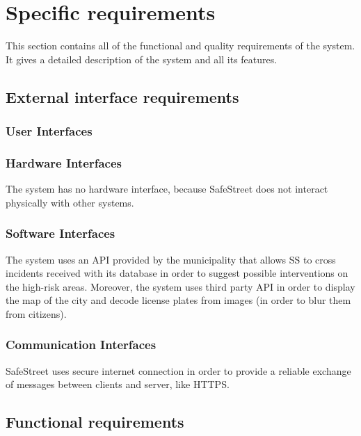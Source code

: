 \documentclass[../RASD.tex]{subfiles}
\begin{document}
    \chapter{Specific requirements}\label{ch:specific-requirements}
    This section contains all of the functional and quality requirements of the system. It gives a detailed description of the system and all its features.
        \section{External interface requirements}\label{sec:external-interface-requirements}
            \subsection{User Interfaces}\label{subsec:user-interfaces}
            \subsection{Hardware Interfaces}\label{subsec:hardware-interfaces}
    The system has no hardware interface, because SafeStreet does not interact physically with other systems.
    \subsection{Software Interfaces}\label{subsec:software-interfaces}
    The system uses an API provided by the municipality that allows SS to cross incidents received with its database in order to suggest possible interventions on the high-risk areas. Moreover, the system uses third party API in order to display the map of the city and decode license plates from images (in order to blur them from citizens).
    \subsection{Communication Interfaces}\label{subsec:communication-interface}
    SafeStreet uses secure internet connection in order to provide a reliable exchange of messages between clients and server, like HTTPS.
    \section{Functional requirements}\label{sec:functional-requirements}
\end{document}
